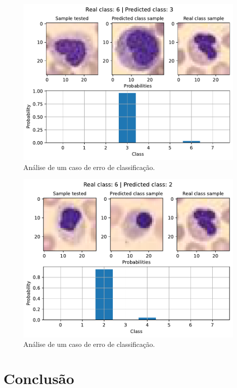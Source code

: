\begin{figure}[H]
\centering
\includegraphics[width=0.75\linewidth]{../../plot/cnn_deep/error_analyser_35}
\caption{Análise de um caso de erro de classificação.}
\label{fig:error_analyser_35_cnn_deep}
\end{figure}

\begin{figure}[H]
\centering
\includegraphics[width=0.75\linewidth]{../../plot/cnn_deep/error_analyser_62}
\caption{Análise de um caso de erro de classificação.}
\label{fig:error_analyser_62_cnn_deep}
\end{figure}

\clearpage
\section{Conclusão}
%
%
%

